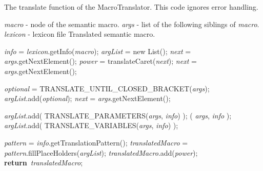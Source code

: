 \documentclass[a4paper,11pt]{article}
\newcommand{\NULL}{\textbf{null}}
\renewcommand{\Return}{\textbf{return}}
\theoremstyle{defTheoStyle}
\theoremstyle{defExampStyle}
\begin{document}
\begin{algorithm}[!ht]
\caption{The translate function of the MacroTranslator. This code ignores error handling.}\label{alg:macro-translation}
	\begin{algorithmic}[1]
	\Require 
		\Statex \textit{macro} - node of the semantic macro. 
		\Statex \textit{args} - list of the following siblings of \textit{macro}. 
		\Statex \textit{lexicon} - lexicon file
	\Ensure 
		\Statex Translated semantic macro.
	
	\State \textit{info} = \textit{lexicon}.getInfo(\textit{macro});
	\State \textit{argList} = new List(); 
	\State \textit{next} = \textit{args}.getNextElement();
	\label{line:next_caret}
		\State \textit{power} = translateCaret(\textit{next});
		\State \textit{next} = \textit{args}.getNextElement();
	\EndIf
	
	\While{\textit{next} is $[$}\label{line:next_optional} 
		\State \textit{optional} = {\scriptsize TRANSLATE\_UNTIL\_CLOSED\_BRACKET}(\textit{args});
		\State \textit{argList}.add(\textit{optional});
		\State \textit{next} = \textit{args}.getNextElement();
	\EndWhile
	
	\State \textit{argList}.add( {\scriptsize TRANSLATE\_PARAMETERS}(\textit{args}, \textit{info}) ); \label{line:trans_paras} 
	( \textit{args}, \textit{info} );  \label{line:skip_ats} 
	\State \textit{argList}.add( {\scriptsize TRANSLATE\_VARIABLES}(\textit{args}, \textit{info}) ); \label{line:trans_vars} 
	
	\State \textit{pattern} = \textit{info}.getTranslationPattern();
	\State \textit{translatedMacro} = \textit{pattern}.fillPlaceHolders(\textit{argList});
	\If{\textit{power} is not \NULL}
		\State \textit{translatedMacro}.add(\textit{power});
	\EndIf
	\State \Return\ \textit{translatedMacro};
	\EndProcedure
	\end{algorithmic}
\end{algorithm}
\end{document}
